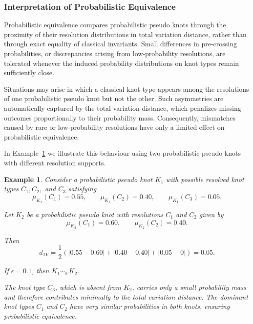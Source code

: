 \documentclass[a4paper, reqno, 12pt]{amsart}
\theoremstyle{plain}
\newtheorem{ex}[theorem]{Example}
\theoremstyle{definition}
\begin{document}

\subsubsection{Interpretation of Probabilistic Equivalence}

Probabilistic equivalence compares probabilistic pseudo knots through the proximity of their resolution distributions in total variation distance, rather than through exact equality of classical invariants. Small differences in pre-crossing probabilities, or discrepancies arising from low-probability resolutions, are tolerated whenever the induced probability distributions on knot types remain sufficiently close.

\smallbreak

Situations may arise in which a classical knot type appears among the resolutions of one probabilistic pseudo knot but not the other. Such asymmetries are automatically captured by the total variation distance, which penalizes missing outcomes proportionally to their probability mass. Consequently, mismatches caused by rare or low-probability resolutions have only a limited effect on probabilistic equivalence.

In Example~\ref{exas} we illustrate this behaviour using two probabilistic pseudo knots with different resolution supports.


\begin{ex}\label{exas}\rm
Consider a probabilistic pseudo knot $K_1$ with possible resolved knot types $C_1,C_2,$ and $C_3$ satisfying
\[
\mu_{K_1}(C_1)=0.55,\qquad
\mu_{K_1}(C_2)=0.40,\qquad
\mu_{K_1}(C_3)=0.05.
\]

Let $K_2$ be a probabilistic pseudo knot with resolutions $C_1$ and $C_2$ given by
\[
\mu_{K_2}(C_1)=0.60,
\qquad
\mu_{K_2}(C_2)=0.40.
\]

Then
\[
d_{TV}
=
\frac12
\left(
|0.55-0.60|
+
|0.40-0.40|
+
|0.05-0|
\right)
=
0.05 .
\]

If $\epsilon=0.1$, then $K_1\sim_{\mathbb P}K_2$.

The knot type $C_3$, which is absent from $K_2$, carries only a small probability mass and therefore contributes minimally to the total variation distance. The dominant knot types $C_1$ and $C_2$ have very similar probabilities in both knots, ensuring probabilistic equivalence.
\end{ex}

\end{document}
